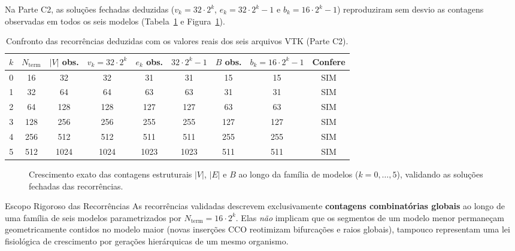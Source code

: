 \documentclass[11pt, a4paper]{article}
\begin{document}
Na Parte C2, as soluções fechadas deduzidas ($v_k = 32\cdot 2^k$, $e_k = 32\cdot 2^k - 1$ e $b_k = 16\cdot 2^k - 1$) reproduziram sem desvio as contagens observadas em todos os seis modelos (Tabela~\ref{tab:recorrencia} e Figura~\ref{fig:recorrencia}).

\begin{table}[htbp]
  \centering
  \footnotesize
  \setlength{\tabcolsep}{4.5pt}
  \caption{Confronto das recorrências deduzidas com os valores reais dos seis arquivos VTK (Parte C2).}
  \label{tab:recorrencia}
  \begin{tabular}{ccccccccc}
    \toprule
    \textbf{$k$} & \textbf{$N_{\mathrm{term}}$} & \textbf{$|V|$ obs.} & \textbf{$v_k = 32\cdot 2^k$} & \textbf{$e_k$ obs.} & \textbf{$32\cdot 2^k - 1$} & \textbf{$B$ obs.} & \textbf{$b_k = 16\cdot 2^k - 1$} & \textbf{Confere} \\
    \midrule
    0 & 16  & 32   & 32   & 31   & 31   & 15  & 15  & SIM \\
    1 & 32  & 64   & 64   & 63   & 63   & 31  & 31  & SIM \\
    2 & 64  & 128  & 128  & 127  & 127  & 63  & 63  & SIM \\
    3 & 128 & 256  & 256  & 255  & 255  & 127 & 127 & SIM \\
    4 & 256 & 512  & 512  & 511  & 511  & 255 & 255 & SIM \\
    5 & 512 & 1024 & 1024 & 1023 & 1023 & 511 & 511 & SIM \\
    \bottomrule
  \end{tabular}
\end{table}

\begin{figure}[htbp]
  \centering
  \resizebox{0.84\linewidth}{!}{}
  \caption{Crescimento exato das contagens estruturais $|V|$, $|E|$ e $B$ ao longo da família de modelos ($k = 0, \dots, 5$), validando as soluções fechadas das recorrências.}
  \label{fig:recorrencia}
\end{figure}

\begin{nota}{Escopo Rigoroso das Recorrências}
As recorrências validadas descrevem exclusivamente \textbf{contagens combinatórias globais} ao longo de uma família de seis modelos parametrizados por $N_{\mathrm{term}} = 16\cdot 2^k$. Elas \emph{não} implicam que os segmentos de um modelo menor permaneçam geometricamente contidos no modelo maior (novas inserções CCO reotimizam bifurcações e raios globais), tampouco representam uma lei fisiológica de crescimento por gerações hierárquicas de um mesmo organismo.
\end{nota}
\end{document}
